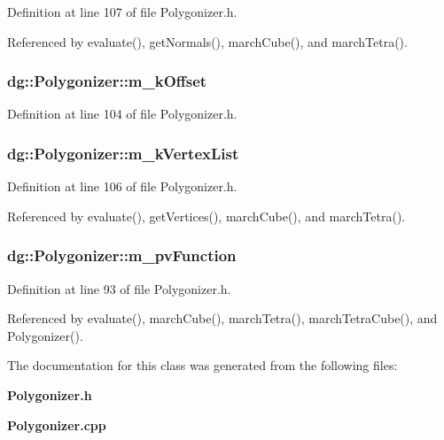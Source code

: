 Definition at line 107 of file Polygonizer.h.

Referenced by evaluate(), get\-Normals(), march\-Cube(), and march\-Tetra().
\subsubsection{ dg::Polygonizer::m\_\-k\-Offset\hspace{0.3cm}{\tt  [protected]}}\label{classdg_1_1Polygonizer_n7}




Definition at line 104 of file Polygonizer.h.
\subsubsection{ dg::Polygonizer::m\_\-k\-Vertex\-List\hspace{0.3cm}{\tt  [protected]}}\label{classdg_1_1Polygonizer_n8}




Definition at line 106 of file Polygonizer.h.

Referenced by evaluate(), get\-Vertices(), march\-Cube(), and march\-Tetra().
\subsubsection{ dg::Polygonizer::m\_\-pv\-Function\hspace{0.3cm}{\tt  [protected]}}\label{classdg_1_1Polygonizer_n0}




Definition at line 93 of file Polygonizer.h.

Referenced by evaluate(), march\-Cube(), march\-Tetra(), march\-Tetra\-Cube(), and Polygonizer().

The documentation for this class was generated from the following files:\begin{CompactItemize}
\item 
{\bf Polygonizer.h}\item 
{\bf Polygonizer.cpp}\end{CompactItemize}
